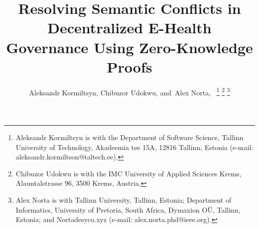 \documentclass[journal]{IEEEtran}
\begin{document}
\title{Resolving Semantic Conflicts in Decentralized E-Health Governance Using Zero-Knowledge Proofs}
%
%
%

\author{
    Aleksandr Kormiltsyn,
    Chibuzor Udokwu,
    and~Alex Norta,~%
    \thanks{
        Aleksandr Kormiltsyn is with the Department of Software Science,
        Tallinn University of Technology, Akadeemia tee 15A, 12816 Tallinn, Estonia
        (e-mail: aleksandr.kormiltson@taltech.ee).
    }%
    \thanks{
        Chibuzor Udokwu is with the IMC University of Applied Sciences Krems,
        Alauntalstrasse 96, 3500 Krems, Austria.
    }%
    \thanks{
        Alex Norta is with Tallinn University, Tallinn, Estonia;
        Department of Informatics, University of Pretoria, South Africa, Dymaxion O{\"U}, Tallinn, Estonia; and Nortadesyco.xyz
        (e-mail: alex.norta.phd@ieee.org).
    }%
}


% 
%


% 
\end{document}
